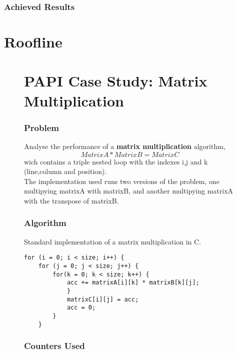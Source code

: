 \documentclass{beamer}
\begin{document}
\begin{frame}
	\frametitle{Achieved Results}
	\begin{figure}[!htp]
	\label{fig:optm_papi}
	\end{figure}
\end{frame}




\section{Roofline}
\begin{frame}
	\begin{figure}[!htp]
		
\section{PAPI Case Study: Matrix Multiplication}
\begin{frame}%
	\frametitle{Problem}

	Analyse the performance of a \textbf{matrix multiplication} algorithm, \begin{equation}Matrix A * Matrix B = Matrix C\end{equation} wich contains a triple nested loop with the indexes i,j and k (line,column and position).\\

	The implementation used runs two versions of the problem, one multipying matrixA with matrixB, and another multipying matrixA with the transpose of matrixB.
\end{frame}%

\begin{frame}[fragile]
	\frametitle{Algorithm}

Standard implementation of a matrix multiplication in C.

\begin{verbatim}
for (i = 0; i < size; i++) {
    for (j = 0; j < size; j++) {
        for(k = 0; k < size; k++) {
            acc += matrixA[i][k] * matrixB[k][j];				
            }		
            matrixC[i][j] = acc;	
            acc = 0;
        }
    }
\end{verbatim}
\end{frame}

\begin{frame}
	\frametitle{Counters Used}


\end{frame}
\end{figure}
\end{frame}
\end{document}
